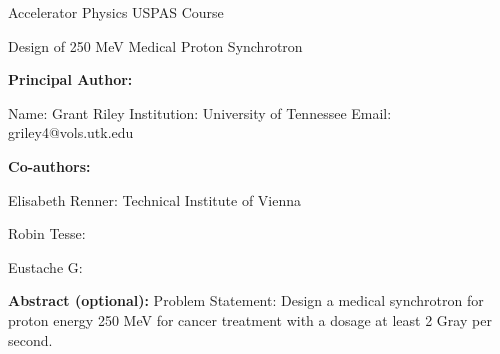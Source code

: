 \documentclass[12pt]{article}
\begin{document}
\def\gs{\ensuremath{\mbox{\, Gy}/s}\xspace}
\def\mev{\ensuremath{\mbox{\,MeV}}\xspace}
\raggedright
\huge
Accelerator Physics USPAS Course \linebreak

Design of 250 MeV Medical Proton Synchrotron \linebreak
\normalsize


\textbf{Principal Author:}

Name: Grant Riley
\linebreak           
Institution:  University of Tennessee
\linebreak
Email: griley4@vols.utk.edu
\linebreak

\textbf{Co-authors:}

Elisabeth Renner: Technical Institute of Vienna

Robin Tesse: 

Eustache G: 
\linebreak

\textbf{Abstract  (optional):}
Problem Statement: Design a medical synchrotron for proton energy 250 MeV for cancer treatment with a dosage
at least 2 Gray per second.  

\pagebreak


\pagebreak


\end{document}
